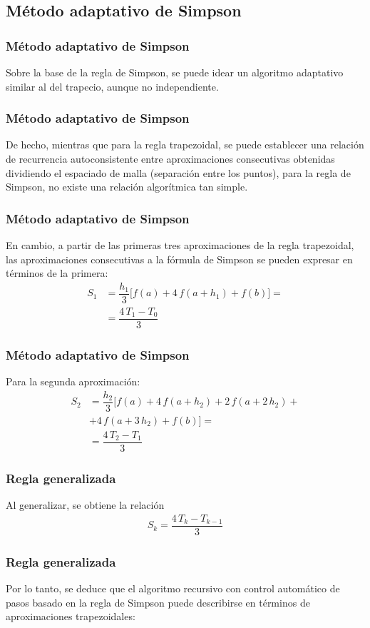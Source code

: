 \subsection{Método adaptativo de Simpson}
\begin{frame}
\frametitle{Método adaptativo de Simpson}
Sobre la base de la regla de Simpson, se puede idear un algoritmo adaptativo similar al del trapecio, aunque no independiente.
\end{frame}
\begin{frame}
\frametitle{Método adaptativo de Simpson}
De hecho, mientras que para la regla trapezoidal, se puede establecer una relación de recurrencia autoconsistente entre aproximaciones consecutivas obtenidas dividiendo el espaciado de malla (separación entre los puntos), para la regla de Simpson, no existe una relación algorítmica tan simple.
\end{frame}
\begin{frame}
\frametitle{Método adaptativo de Simpson}
En cambio, a partir de las primeras tres aproximaciones de la regla trapezoidal, las aproximaciones consecutivas a la fórmula de Simpson se pueden expresar en términos de la primera:
\begin{align*}
S_{1} &= \dfrac{h_{1}}{3} \bigg[ f(a) + 4 \, f(a + h_{1}) + f(b) \bigg] = \\
&= \dfrac{4 \, T_{1} - T_{0}}{3}
\end{align*}
\end{frame}
\begin{frame}
\frametitle{Método adaptativo de Simpson}
Para la segunda aproximación:
\begin{align*}
S_{2} &= \dfrac{h_{2}}{3} \bigg[ f(a) + 4 \, f(a + h_{2}) + 2 \, f(a + 2 \, h_{2}) + \\
&+ 4 \, f(a + 3 \, h_{2}) + f(b) \bigg] = \\
&= \dfrac{4 \, T_{2} - T_{1}}{3}
\end{align*}
\end{frame}
\begin{frame}
\frametitle{Regla generalizada}
Al generalizar, se obtiene la relación
\begin{align*}
S_{k} = \dfrac{4 \, T_{k} - T_{k-1}}{3}
\end{align*}
\end{frame}
\begin{frame}[fragile]
\frametitle{Regla generalizada}
Por lo tanto, se deduce que el algoritmo recursivo con control automático de pasos basado en la regla de Simpson puede describirse en términos de aproximaciones trapezoidales:
\end{frame}
